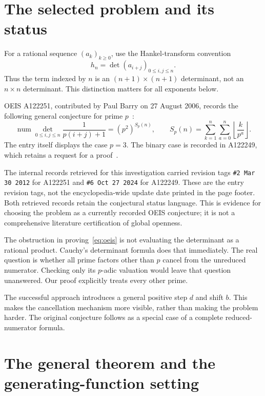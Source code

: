 \documentclass[11pt,a4paper]{article}
\theoremstyle{definition}
\theoremstyle{remark}
\newcommand{\num}{\operatorname{num}}
\newcommand{\floor}[1]{\left\lfloor #1\right\rfloor}
\begin{document}
\section{The selected problem and its status}
\label{sec:problem}

For a rational sequence $(a_k)_{k\ge0}$, use the Hankel-transform convention
\[
 h_n=\det(a_{i+j})_{0\le i,j\le n}.
\]
Thus the term indexed by $n$ is an $(n+1)\times(n+1)$ determinant, not an
$n\times n$ determinant. This distinction matters for all exponents below.

OEIS A122251, contributed by Paul Barry on 27 August 2006, records the
following general conjecture for prime $p$~\cite{oeis251}:
\begin{equation}
 \num\det_{0\le i,j\le n}\frac1{p(i+j)+1}
  =(p^2)^{S_p(n)},\qquad
 S_p(n)=\sum_{k=1}^n\sum_{a=0}^{n}\floor{\frac{k}{p^a}}.
 \label{eq:oeis}
\end{equation}
The entry itself displays the case $p=3$. The binary case is recorded in
A122249, which retains a request for a proof~\cite{oeis249}.

The internal records retrieved for this investigation carried revision tags
\texttt{\#2 Mar 30 2012} for A122251 and
\texttt{\#6 Oct 27 2024} for A122249. These are the entry revision tags,
not the encyclopedia-wide update date printed in the page footer. Both
retrieved records retain the conjectural status language. This is evidence
for choosing the problem as a currently recorded OEIS conjecture; it is not
a comprehensive literature certification of global openness.

The obstruction in proving~\eqref{eq:oeis} is not evaluating the determinant
as a rational product. Cauchy's determinant formula does that immediately.
The real question is whether all prime factors other than $p$ cancel from
the unreduced numerator. Checking only its $p$-adic valuation would leave
that question unanswered. Our proof explicitly treats every other prime.

The successful approach introduces a general positive step $d$ and shift
$b$. This makes the cancellation mechanism more visible, rather than
making the problem harder. The original conjecture follows as a special
case of a complete reduced-numerator formula.

\section{The general theorem and the generating-function setting}
\label{sec:main}
\end{document}
